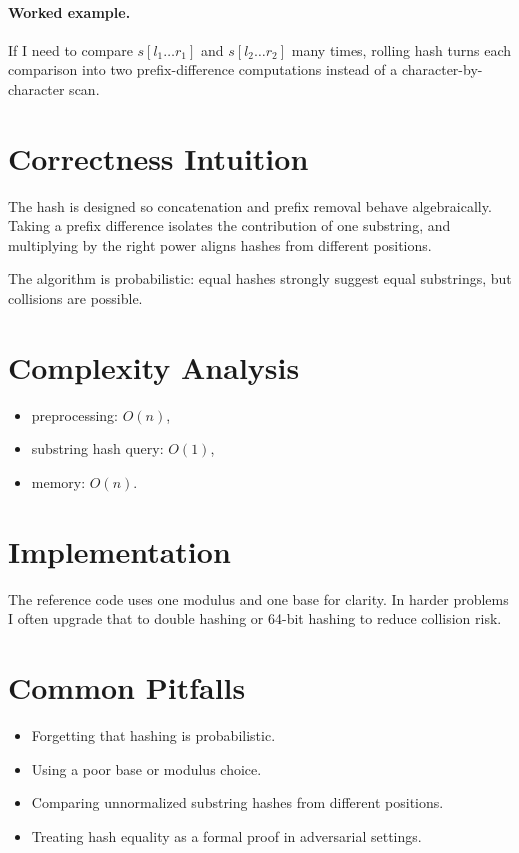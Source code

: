 \paragraph{Worked example.}
If I need to compare \(s[l_1 \dots r_1]\) and \(s[l_2 \dots r_2]\) many times, rolling hash turns each comparison into
two prefix-difference computations instead of a character-by-character scan.

\section*{Correctness Intuition}

The hash is designed so concatenation and prefix removal behave algebraically. Taking a prefix difference isolates the
contribution of one substring, and multiplying by the right power aligns hashes from different positions.

The algorithm is probabilistic: equal hashes strongly suggest equal substrings, but collisions are possible.

\section*{Complexity Analysis}

\begin{itemize}
  \item preprocessing: \(O(n)\),
  \item substring hash query: \(O(1)\),
  \item memory: \(O(n)\).
\end{itemize}

\section*{Implementation}

The reference code uses one modulus and one base for clarity. In harder problems I often upgrade that to double hashing
or 64-bit hashing to reduce collision risk.

\section*{Common Pitfalls}

\begin{itemize}
  \item Forgetting that hashing is probabilistic.
  \item Using a poor base or modulus choice.
  \item Comparing unnormalized substring hashes from different positions.
  \item Treating hash equality as a formal proof in adversarial settings.
\end{itemize}

